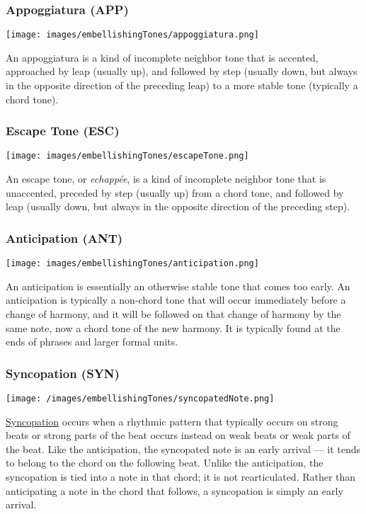 \documentclass{book}
\begin{document}
\hypertarget{appoggiatura-app}{%
\subsubsection{Appoggiatura (APP)}\label{appoggiatura-app}}

\texttt{[image: images/embellishingTones/appoggiatura.png]}

An appoggiatura is a kind of incomplete neighbor tone that is accented,
approached by leap (usually up), and followed by step (usually down, but
always in the opposite direction of the preceding leap) to a more stable tone
(typically a chord tone).

\hypertarget{escape-tone-esc}{%
\subsubsection{Escape Tone (ESC)}\label{escape-tone-esc}}

\texttt{[image: images/embellishingTones/escapeTone.png]}

An escape tone, or \emph{echappée}, is a kind of incomplete neighbor tone that
is unaccented, preceded by step (usually up) from a chord tone, and followed
by leap (usually down, but always in the opposite direction of the preceding
step).

\hypertarget{anticipation-ant}{%
\subsubsection{Anticipation (ANT)}\label{anticipation-ant}}

\texttt{[image: images/embellishingTones/anticipation.png]}

An anticipation is essentially an otherwise stable tone that comes too early.
An anticipation is typically a non-chord tone that will occur immediately
before a change of harmony, and it will be followed on that change of harmony
by the same note, now a chord tone of the new harmony. It is typically found
at the ends of phrases and larger formal units.

\hypertarget{syncopation-syn}{%
\subsubsection{Syncopation (SYN)}\label{syncopation-syn}}

\texttt{[image: /images/embellishingTones/syncopatedNote.png]}

\href{http://openmusictheory.com/syncopation.html}{Syncopation} occurs when a
rhythmic pattern that typically occurs on strong beats or strong parts of the
beat occurs instead on weak beats or weak parts of the beat. Like the
anticipation, the syncopated note is an early arrival --- it tends to belong
to the chord on the following beat. Unlike the anticipation, the syncopation
is tied into a note in that chord; it is not rearticulated. Rather than
anticipating a note in the chord that follows, a syncopation is simply an
early arrival.
\end{document}

